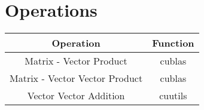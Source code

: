 \section{Operations}

\begin{tabular}{c | c}
	Operation & Function \\
	\hline
	Matrix - Vector Product & cublas \\
	Matrix - Vector Vector Product & cublas \\
	Vector Vector Addition & cuutils
\end{tabular}